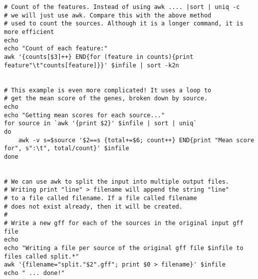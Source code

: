 \documentclass[11pt]{article}
\begin{document}
\begin{verbatim}
# Count of the features. Instead of using awk .... |sort | uniq -c
# we will just use awk. Compare this with the above method
# used to count the sources. Although it is a longer command, it is more efficient
echo
echo "Count of each feature:"
awk '{counts[$3]++} END{for (feature in counts){print feature"\t"counts[feature]}}' $infile | sort -k2n


# This example is even more complicated! It uses a loop to
# get the mean score of the genes, broken down by source.
echo
echo "Getting mean scores for each source..."
for source in `awk '{print $2}' $infile | sort | uniq`
do
    awk -v s=$source '$2==s {total+=$6; count++} END{print "Mean score for", s":\t", total/count}' $infile
done


# We can use awk to split the input into multiple output files.
# Writing print "line" > filename will append the string "line"
# to a file called filename. If a file called filename
# does not exist already, then it will be created.
#
# Write a new gff for each of the sources in the original input gff file
echo
echo "Writing a file per source of the original gff file $infile to files called split.*"
awk '{filename="split."$2".gff"; print $0 > filename}' $infile
echo " ... done!"
\end{verbatim}


\end{document}

